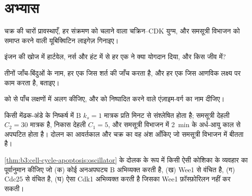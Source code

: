 \section{अभ्यास}

\begin{exercise}[$\star$]\label{exo:b3:cell-cycle-apoptosis:1}
चक्र की चारों प्रावस्थाएँ, हर संक्रमण को चलाने वाला चक्रिन--CDK युग्म,
और समसूत्री विभाजन को समाप्त करने वाली यूबिक्विटिन लाइगेज़ गिनाइए।
\end{exercise}

\begin{exercise}[$\star$]\label{exo:b3:cell-cycle-apoptosis:2}
इंजन की खोज में हार्टवेल, नर्स और हंट में से हर एक ने क्या योगदान दिया,
और किस जीव में?
\end{exercise}

\begin{exercise}[$\star$]\label{exo:b3:cell-cycle-apoptosis:3}
तीनों जाँच-बिंदुओं के नाम, हर एक जिस शर्त की जाँच करता है, और हर एक जिस
आणविक लक्ष्य पर काम करता है, बताइए।
\end{exercise}

\begin{exercise}[$\star$]\label{exo:b3:cell-cycle-apoptosis:4}
 को  से पाँच लक्षणों में अलग कीजिए, और  को
निष्पादित करने वाले एंज़ाइम-वर्ग का नाम दीजिए।
\end{exercise}

\begin{exercise}[$\star\star$]\label{exo:b3:cell-cycle-apoptosis:5}
किसी मेंढक-अंडे के निष्कर्ष में  B $k_{s} = 1$ मात्रक प्रति
मिनट से संश्लेषित होता है; समसूत्री देहली $C_{2} = 30$ मात्रक है, निकास
देहली $C_{1} = 5$, और समसूत्री विभाजन में 
\qty{2}{min} के अर्ध-आयु काल से अपघटित होता है। दोलन का आवर्तकाल और
चक्र का वह अंश आँकिए जो समसूत्री विभाजन में बीतता है।
\end{exercise}

\begin{exercise}[$\star\star$]\label{exo:b3:cell-cycle-apoptosis:6}
\cref{thm:b3:cell-cycle-apoptosis:oscillator} के दोलक के रूप में किसी
ऐसी कोशिका के व्यवहार का पूर्वानुमान कीजिए जो (क) कोई अनअपघट्य
 B अभिव्यक्त करती है, (ख) Wee1 से वंचित है, (ग) Cdc25 से वंचित
है, (घ) ऐसा Cdk1 अभिव्यक्त करती है जिसका Wee1 फ़ॉस्फ़ोरिलन नहीं कर सकती।
\end{exercise}

